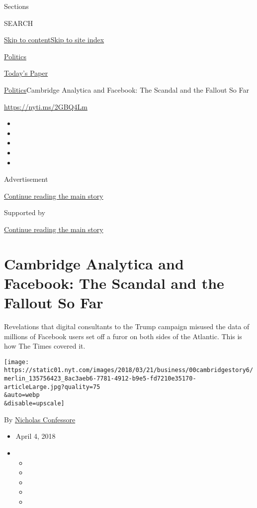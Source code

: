 Sections

SEARCH

\protect\hyperlink{site-content}{Skip to
content}\protect\hyperlink{site-index}{Skip to site index}

\href{https://www.nytimes.com/section/politics}{Politics}

\href{https://myaccount.nytimes.com/auth/login?response_type=cookie\&client_id=vi}{}

\href{https://www.nytimes.com/section/todayspaper}{Today's Paper}

\href{/section/politics}{Politics}\textbar{}Cambridge Analytica and
Facebook: The Scandal and the Fallout So Far

\url{https://nyti.ms/2GBQ4Lm}

\begin{itemize}
\item
\item
\item
\item
\item
\end{itemize}

Advertisement

\protect\hyperlink{after-top}{Continue reading the main story}

Supported by

\protect\hyperlink{after-sponsor}{Continue reading the main story}

\hypertarget{cambridge-analytica-and-facebook-the-scandal-and-the-fallout-so-far}{%
\section{Cambridge Analytica and Facebook: The Scandal and the Fallout
So
Far}\label{cambridge-analytica-and-facebook-the-scandal-and-the-fallout-so-far}}

Revelations that digital consultants to the Trump campaign misused the
data of millions of Facebook users set off a furor on both sides of the
Atlantic. This is how The Times covered it.

\texttt{[image: https://static01.nyt.com/images/2018/03/21/business/00cambridgestory6/merlin\_135756423\_8ac3aeb6-7781-4912-b9e5-fd7210e35170-articleLarge.jpg?quality=75\\\&auto=webp\\\&disable=upscale]}

By \href{https://www.nytimes.com/by/nicholas-confessore}{Nicholas
Confessore}

\begin{itemize}
\item
  April 4, 2018
\item
  \begin{itemize}
  \item
  \item
  \item
  \item
  \item
  \end{itemize}
\end{itemize}

